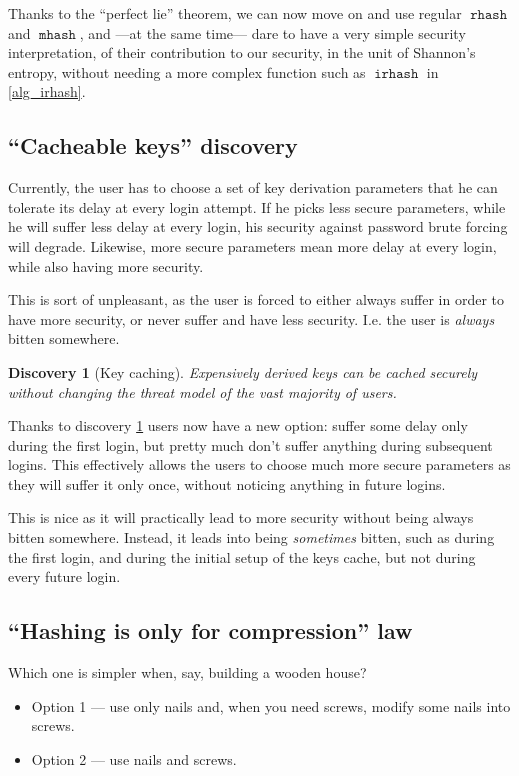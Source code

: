 \documentclass[twocolumn]{article}
\newtheorem{discovery}{Discovery}[section]
\DeclareMathOperator{\rhash}{\mathtt{rhash}}
\DeclareMathOperator{\mhash}{\mathtt{mhash}}
\DeclareMathOperator{\irhash}{\mathtt{irhash}}
\begin{document}
Thanks to the ``perfect lie'' theorem, we can now move on and use regular
$\rhash$ and $\mhash$, and ---at the same time--- dare to have a very
simple security interpretation, of their contribution to our security, in
the unit of Shannon's entropy, without needing a more complex function such
as $\irhash$ in \cref{alg_irhash}.

\subsection{``Cacheable keys'' discovery}
Currently, the user has to choose a set of key derivation parameters that
he can tolerate its delay at every login attempt.  If he picks less secure
parameters, while he will suffer less delay at every login, his security
against password brute forcing will degrade.  Likewise, more secure
parameters mean more delay at every login, while also having more security.

This is sort of unpleasant, as the user is forced to either always suffer
in order to have more security, or never suffer and have less security.
I.e. the user is \emph{always} bitten somewhere.

\begin{discovery}[Key caching]\label{discov_key_caching}
    Expensively derived keys can be cached securely without changing the
    threat model of the vast majority of users.
\end{discovery}

Thanks to discovery \ref{discov_key_caching} users now have a new option:
suffer some delay only during the first login, but pretty much don't suffer
anything during subsequent logins.  This effectively allows the users to
choose much more secure parameters as they will suffer it only once,
without noticing anything in future logins.

This is nice as it will practically lead to more security without being
{always} bitten somewhere.  Instead, it leads into being \emph{sometimes}
bitten, such as during the first login, and during the initial setup of the
keys cache, but not during every future login.

\subsection{``Hashing is only for compression'' law}
Which one is simpler when, say, building a wooden house?
\begin{itemize}
    \item Option 1 --- use only nails and, when you need screws,
    modify some nails into screws.

    \item Option 2 --- use nails and screws.
\end{itemize}
\end{document}
